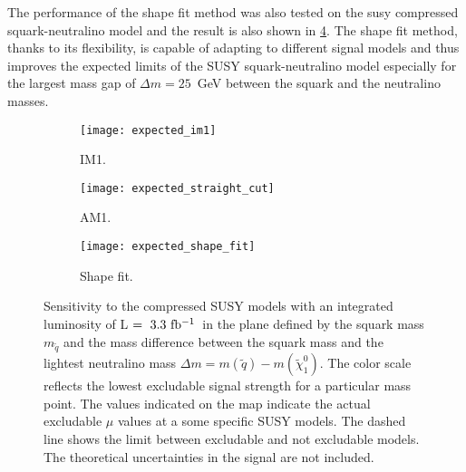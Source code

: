 The performance of the shape fit method was also tested on the \gls{susy}
compressed squark-neutralino model and the result is also shown in
\cref{fig:im1_straight_comparison}. The shape fit method, thanks to its
flexibility, is capable of adapting to different signal models and thus improves
the expected limits of the SUSY squark-neutralino model especially for the
largest mass gap of $\Delta m = 25$~GeV between the squark and the neutralino
masses.
\begin{figure}[!htb]
  \centering
  \begin{subfigure}[t]{.48\linewidth}
    \texttt{[image: expected\_im1]}
    \caption{IM1.}
    \label{fig:expected_im1}
  \end{subfigure}
  \begin{subfigure}[t]{.48\linewidth}
    \texttt{[image: expected\_straight\_cut]}
    \caption{AM1.}
    \label{fig:expected_straight}
  \end{subfigure}
  \begin{subfigure}[t]{.48\linewidth}
    \texttt{[image: expected\_shape\_fit]}
    \caption{Shape fit.}
    \label{fig:expected_shape}
  \end{subfigure}
  \caption{Sensitivity to the compressed SUSY models with an integrated
    luminosity of L$~=~3.3~\mbox{fb$^{-1}$}$~in the plane defined by the squark mass
    $m_{\tilde{q}}$ and the mass difference between the squark mass and the
    lightest neutralino mass
    $\Delta m = m(\tilde{q}) - m(\tilde{\chi}_{1}^{0})$. The color scale
    reflects the lowest excludable signal strength for a particular mass
    point. The values indicated on the map indicate the actual excludable $\mu$
    values at a some specific SUSY models. The dashed line shows the limit
    between excludable and not excludable models. The theoretical uncertainties
    in the signal are not included.}
  \label{fig:im1_straight_comparison}
\end{figure}
\pagebreak[4]
